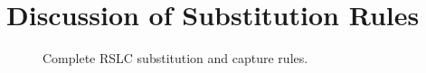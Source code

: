 \documentclass[10pt]{sigplanconf}
\begin{document}
\section{Discussion of Substitution Rules}
\begin{figure}[t]
	\TypeRules{
		\SubstLamCapture \qquad \SubstLam \qquad
		\SubstApp \\
		\SubstVarX \qquad \SubstVarY \\
		\SubstCaseCapture \\ \SubstCase \\
		\SubstZero \qquad \SubstSuc \\
		\SubstLetCapture \qquad \SubstLet
	}
	\TypeRules{
		\CaptureLam \qquad \CaptureApp \qquad
		\CaptureVarX \qquad \CaptureVarY \\
		\CaptureCase \\
		\CaptureZero \qquad \CaptureSuc \qquad \CaptureLet
	}
	\caption{Complete RSLC substitution and capture rules.}
	\label{fig:subst-complete}
\end{figure}
\end{document}
